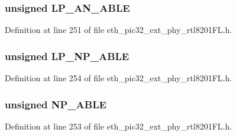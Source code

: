 \hypertarget{union_____a_n_e_x_pbits__t_af491690ecb970d54e41753af685c88c4}{}
\subsubsection[{L\+P\+\_\+\+A\+N\+\_\+\+A\+B\+L\+E}]{\setlength{\rightskip}{0pt plus 5cm}unsigned L\+P\+\_\+\+A\+N\+\_\+\+A\+B\+L\+E}\label{union_____a_n_e_x_pbits__t_af491690ecb970d54e41753af685c88c4}


Definition at line 251 of file eth\+\_\+pic32\+\_\+ext\+\_\+phy\+\_\+rtl8201\+F\+L.\+h.

\hypertarget{union_____a_n_e_x_pbits__t_a70459ea04fc22f1abc90777a1da04b40}{}
\subsubsection[{L\+P\+\_\+\+N\+P\+\_\+\+A\+B\+L\+E}]{\setlength{\rightskip}{0pt plus 5cm}unsigned L\+P\+\_\+\+N\+P\+\_\+\+A\+B\+L\+E}\label{union_____a_n_e_x_pbits__t_a70459ea04fc22f1abc90777a1da04b40}


Definition at line 254 of file eth\+\_\+pic32\+\_\+ext\+\_\+phy\+\_\+rtl8201\+F\+L.\+h.

\hypertarget{union_____a_n_e_x_pbits__t_a4502f03b3664f0c1b02bfbfdae50f349}{}
\subsubsection[{N\+P\+\_\+\+A\+B\+L\+E}]{\setlength{\rightskip}{0pt plus 5cm}unsigned N\+P\+\_\+\+A\+B\+L\+E}\label{union_____a_n_e_x_pbits__t_a4502f03b3664f0c1b02bfbfdae50f349}


Definition at line 253 of file eth\+\_\+pic32\+\_\+ext\+\_\+phy\+\_\+rtl8201\+F\+L.\+h.

